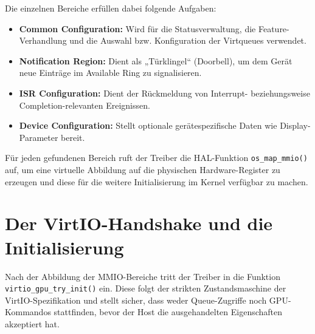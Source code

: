Die einzelnen Bereiche erfüllen dabei folgende Aufgaben:
\begin{itemize}
    \item \textbf{Common Configuration:} Wird für die Statusverwaltung, die Feature-Verhandlung und die Auswahl bzw. Konfiguration der Virtqueues verwendet.
    \item \textbf{Notification Region:} Dient als „Türklingel“ (Doorbell), um dem Gerät neue Einträge im Available Ring zu signalisieren.
    \item \textbf{ISR Configuration:} Dient der Rückmeldung von Interrupt- beziehungsweise Completion-relevanten Ereignissen.
    \item \textbf{Device Configuration:} Stellt optionale gerätespezifische Daten wie Display-Parameter bereit.
\end{itemize}

Für jeden gefundenen Bereich ruft der Treiber die HAL-Funktion
\texttt{os\_map\_mmio()} auf, um eine virtuelle Abbildung auf die physischen
Hardware-Register zu erzeugen und diese für die weitere Initialisierung im
Kernel verfügbar zu machen.

\begin{center}
\end{center}

\section{Der VirtIO-Handshake und die Initialisierung}
Nach der Abbildung der MMIO-Bereiche tritt der Treiber in die Funktion
\texttt{virtio\_gpu\_try\_init()} ein. Diese folgt der strikten
Zustandsmaschine der VirtIO-Spezifikation und stellt sicher, dass weder
Queue-Zugriffe noch GPU-Kommandos stattfinden, bevor der Host die
ausgehandelten Eigenschaften akzeptiert hat.

